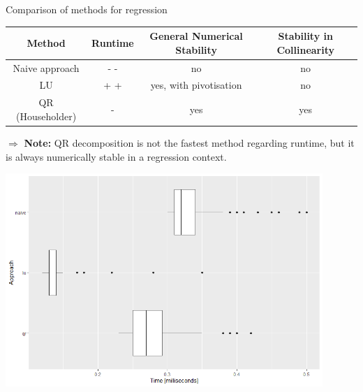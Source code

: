 \begin{vbframe}{Comparison of methods for regression}

\begin{footnotesize}
\begin{table}
\centering
\begin{tabular}{c|c|c|c}
Method                    & Runtime         & General Numerical Stability & Stability in Collinearity\\
\hline
Naive approach            &   - -           & no                        & no \\
LU                        &   + +           & yes, with pivotisation    & no \\
QR (Householder)          &   -             & yes                       & yes\\

\end{tabular}
\end{table}
\end{footnotesize}

\lz

$\Rightarrow$ \textbf{Note:} QR decomposition is not the fastest method regarding runtime, but it is always numerically stable in a regression context.

\framebreak

\lz


\begin{center}
\includegraphics[width = 0.9\textwidth]{figure_man/method_comparison.png} 
\end{center}

% 
% 

\end{vbframe}

